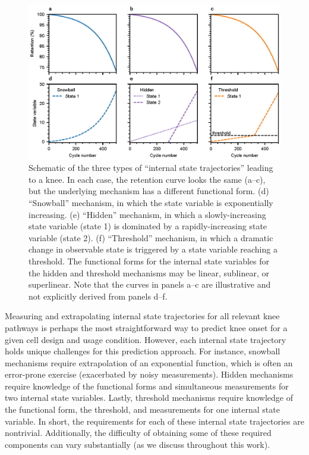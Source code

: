 \documentclass[journal=jpclcd,manuscript=article]{achemso}
\begin{document}
\begin{figure}[htp]
    \centering
    \includegraphics[scale=1]{figures/snowball_hidden_threshold.eps}
    \caption{Schematic of the three types of ``internal state trajectories'' leading to a knee. In each case, the retention curve looks the same (a--c), but the underlying mechanism has a different functional form. (d) ``Snowball'' mechanism, in which the state variable is exponentially increasing. (e) ``Hidden'' mechanism, in which a slowly-increasing state variable (state 1) is dominated by a rapidly-increasing state variable (state 2). (f) ``Threshold'' mechanism, in which a dramatic change in observable state is triggered by a state variable reaching a threshold.
    The functional forms for the internal state variables for the hidden and threshold mechanisms may be linear, sublinear, or superlinear.
    Note that the curves in panels a--c are illustrative and not explicitly derived from panels d--f.
    }
    \label{fig:snowball_vs_hidden_vs_threshold}
\end{figure}

Measuring and extrapolating internal state trajectories for all relevant knee pathways is perhaps the most straightforward way to predict knee onset for a given cell design and usage condition.
However, each internal state trajectory holds unique challenges for this prediction approach.
For instance, snowball mechanisms require extrapolation of an exponential function, which is often an error-prone exercise (exacerbated by noisy measurements).
Hidden mechanisms require knowledge of the functional forms and simultaneous measurements for two internal state variables.
Lastly, threshold mechanisms require knowledge of the functional form, the threshold, and measurements for one internal state variable.
In short, the requirements for each of these internal state trajectories are nontrivial.
Additionally, the difficulty of obtaining some of these required components can vary substantially (as we discuss throughout this work).
\end{document}
